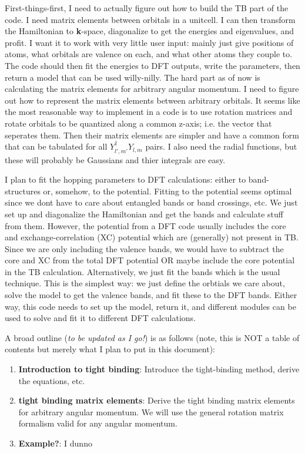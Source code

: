 \documentclass[prb,aps,11pt,superscriptaddress,floatfix]{revtex4-2}
\begin{document}
First-things-first, I need to actually figure out how to build the TB part of the code. I need matrix elements between orbitals in a unitcell. I can then transform the Hamiltonian to \textbf{k}-space, diagonalize to get the energies and eigenvalues, and profit. I want it to work with very little user input: mainly just give positions of atoms, what orbitals are valence on each, and what other atoms they couple to. The code should then fit the energies to DFT outputs, write the parameters, then return a model that can be used willy-nilly. The hard part as of now is calculating the matrix elements for arbitrary angular momentum. I need to figure out how to represent the matrix elements between arbitrary orbitals. It seems like the most reasonable way to implement in a code is to use rotation matrices and rotate orbitals to be quantized along a common z-axis; i.e. the vector that seperates them. Then their matrix elements are simpler and have a common form that can be tabulated for all $Y^\dagger_{l',m'}Y_{l,m}$ pairs. I also need the radial functions, but these will probably be Gaussians and thier integrals are easy. 

I plan to fit the hopping parameters to DFT calculations: either to band-structures or, somehow, to the potential. Fitting to the potential seems optimal since we dont have to care about entangled bands or band crossings, etc. We just set up and diagonalize the Hamiltonian and get the bands and calculate stuff from them. However, the potential from a DFT code usually includes the core and exchange-correlation (XC) potential which are (generally) not present in TB. Since we are only including the valence bands, we would have to subtract the core and XC from the total DFT potential OR maybe include the core potential in the TB calculation. Alternatively, we just fit the bands which is the usual technique. This is the simplest way: we just define the orbtials we care about, solve the model to get the valence bands, and fit these to the DFT bands. Either way, this code needs to set up the model, return it, and different modules can be used to solve and fit it to different DFT calculations. 


A broad outline (\emph{to be updated as I go!}) is as follows (note, this is NOT a table of contents but merely what I plan to put in this document):

\begin{enumerate}
  \item \textbf{Introduction to tight binding}: Introduce the tight-binding method, derive the equations, etc.
  \item \textbf{tight binding matrix elements}: Derive the tight binding matrix elements for arbitrary angular momentum. We will use the general rotation matrix formalism valid for any angular momentum.
  \item \textbf{Example?}: I dunno
\end{enumerate}
\end{document}
